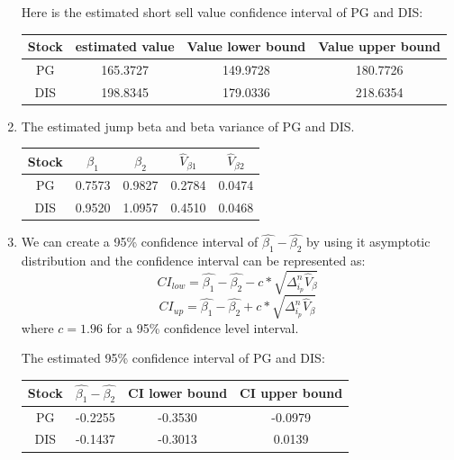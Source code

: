 \documentclass[12pt,letterpaper]{article}
\begin{document}
\begin{enumerate}[label=\textbf{(\Alph*)}]
Here is the estimated short sell value confidence interval of PG and DIS:
\begin{table}[ht]
	\centering %
	\begin{tabular}{cccc} %
		\hline\hline %
		Stock& estimated value & Value lower bound & Value upper bound\\
		\hline %
		PG&165.3727 & 149.9728&180.7726\\
		DIS&198.8345&179.0336&218.6354\\ %
		\hline %
	\end{tabular}
\end{table}
\vspace{-6mm}

\item The estimated jump beta and beta variance of PG and DIS.

\begin{table}[ht]
	\centering %
	\begin{tabular}{ccccc} %
		\hline\hline %
		Stock& $\beta_1$ & $\beta_2$ & $\hat{V}_{\beta1}$&$\hat{V}_{\beta2}$\\
		\hline %
		PG&0.7573&0.9827&0.2784 & 0.0474\\
		DIS&0.9520&1.0957&0.4510&0.0468\\ %
		\hline %
	\end{tabular}
\end{table}




\newpage
\item We can create a 95\% confidence interval of $\hat{\beta_1}-\hat{\beta_2}$ by using it asymptotic distribution and the confidence interval can be represented as:
$$CI_{low}=\hat{\beta_1}-\hat{\beta_2}-c*\sqrt{\Delta_{i_p}^n\hat{V}_{\beta}}$$ 	
$$CI_{up}=\hat{\beta_1}-\hat{\beta_2}+c*\sqrt{\Delta_{i_p}^n\hat{V}_{\beta}}$$ 
where $c=1.96$ for a 95\% confidence level interval.

The estimated 95\% confidence interval of PG and DIS:
\begin{table}[ht]
	\centering %
	\begin{tabular}{cccc} %
		\hline\hline %
		Stock& $\hat{\beta_1}-\hat{\beta_2}$  & CI lower bound &CI upper bound\\
		\hline %
		PG&-0.2255&-0.3530 & -0.0979\\
		DIS&-0.1437&-0.3013&0.0139\\ %
		\hline %
	\end{tabular}
\end{table}	




\end{enumerate}
\end{document}
